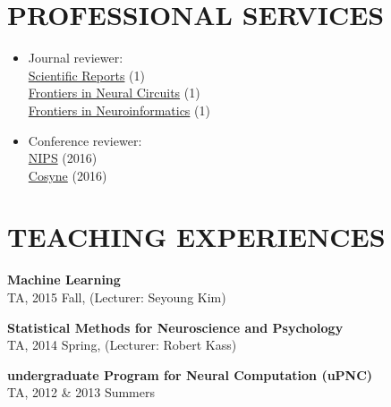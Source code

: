 \documentclass[paper=letter,fontsize=11pt]{scrartcl} %
\newcommand{\NewPart}[2]{\section*{\uppercase{#1} #2}}
\begin{document}



\NewPart{Professional Services}{}
\begin{itemize}
\item Journal reviewer: \\
\href{https://www.nature.com/srep/}{Scientific Reports} (1)\\
\href{https://www.frontiersin.org/journals/neural-circuits}{Frontiers in Neural Circuits} (1)\\
\href{https://www.frontiersin.org/journals/neuroinformatics}{Frontiers in Neuroinformatics} (1)

\item Conference reviewer: \\
\href{https://nips.cc/Conferences/2016/}{NIPS} (2016)\\
\href{http://www.cosyne.org/c/index.php?title=Cosyne_16}{Cosyne} (2016)
\end{itemize}






\NewPart{Teaching Experiences}{}
\begin{etaremune}
\item \textbf{Machine Learning}  \\
TA, 2015 Fall, (Lecturer: Seyoung Kim)

\item \textbf{Statistical Methods for Neuroscience and Psychology}\\
TA, 2014 Spring, (Lecturer: Robert Kass)

\item \textbf{undergraduate Program for Neural Computation (uPNC)}\\
TA, 2012 \& 2013 Summers
\end{etaremune}
 
\end{document}
